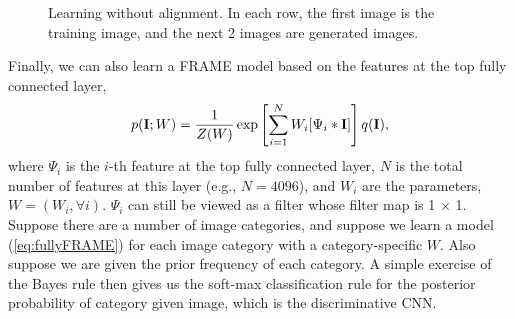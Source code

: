 \documentclass[letterpaper]{article}
\def\I{{\bf I}}
\begin{document}
\begin{figure}
	\centering
	\setlength{\fboxrule}{1pt}
	\setlength{\fboxsep}{0cm}
		\caption{Learning without alignment.  
		In each row, the first  image is the training image, and the next  2  images are generated images. }
	\label{fig:nonalign1}
\end{figure}


Finally, we can also learn a FRAME model based on the features at the top fully connected layer, 
\begin{eqnarray}
   p(\I; W) =  \frac{1}{Z(W)}  \exp \left[  \sum_{i=1}^{N} W_i [\Psi_i*\I] \right]q(\I), 
   \label{eq:fullyFRAME}
\end{eqnarray}
where $\Psi_i$ is the $i$-th feature at the top fully connected layer,  $N$ is the total number of features at this layer (e.g., $N = 4096$), and $W_i$ are the parameters, $W = (W_i, \forall i)$.  $\Psi_i$ can still be viewed as a filter whose filter map is 1 $\times$ 1. Suppose there are a number of image categories, and suppose we learn a model (\ref{eq:fullyFRAME}) for each image category with a category-specific $W$. Also suppose we are given the prior frequency of each category. A simple exercise of the Bayes rule then gives us the soft-max classification rule for the posterior probability of category given image, which is   the discriminative CNN. 
\end{document}
